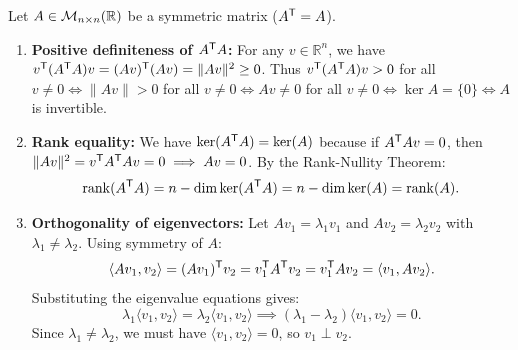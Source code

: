 \begin{exercisesolution}
\label{sol:symmetric_matrix_orthogonal_eigenvectors}
Let $A \in \mathcal{M}_{n \times n}(\mathbb{R})$ be a symmetric matrix ($A^{\mathsf{T}} = A$).
\begin{enumerate}[label=\textbf{(\alph*)}]
    \item \textbf{Positive definiteness of $A^{\mathsf{T}} A$:}
    For any $v \in \mathbb{R}^n$, we have $v^{\mathsf{T}} (A^{\mathsf{T}} A) v = (Av)^{\mathsf{T}} (Av) = \|Av\|^2 \ge 0$.
    Thus $v^{\mathsf{T}} (A^{\mathsf{T}} A) v > 0$ for all $v \ne 0 \iff \|Av\| > 0$ for all $v \ne 0 \iff Av \ne 0$ for all $v \ne 0 \iff \ker A = \{0\} \iff A$ is invertible.

    \item \textbf{Rank equality:}
    We have $\ker(A^{\mathsf{T}} A) = \ker(A)$ because if $A^{\mathsf{T}} A v = 0$, then $\|Av\|^2 = v^{\mathsf{T}} A^{\mathsf{T}} A v = 0 \implies Av = 0$.
    By the Rank-Nullity Theorem:
    \[
    \operatorname{rank}(A^{\mathsf{T}} A) = n - \dim\ker(A^{\mathsf{T}} A) = n - \dim\ker(A) = \operatorname{rank}(A).
    \]

    \item \textbf{Orthogonality of eigenvectors:}
    Let $Av_1 = \lambda_1 v_1$ and $Av_2 = \lambda_2 v_2$ with $\lambda_1 \ne \lambda_2$.
    Using symmetry of $A$:
    \[
    \langle Av_1, v_2 \rangle = (Av_1)^{\mathsf{T}} v_2 = v_1^{\mathsf{T}} A^{\mathsf{T}} v_2 = v_1^{\mathsf{T}} A v_2 = \langle v_1, Av_2 \rangle.
    \]
    Substituting the eigenvalue equations gives:
    \[
    \lambda_1 \langle v_1, v_2 \rangle = \lambda_2 \langle v_1, v_2 \rangle \implies (\lambda_1 - \lambda_2) \langle v_1, v_2 \rangle = 0.
    \]
    Since $\lambda_1 \ne \lambda_2$, we must have $\langle v_1, v_2 \rangle = 0$, so $v_1 \perp v_2$. \qedhere
\end{enumerate}
\end{exercisesolution}

